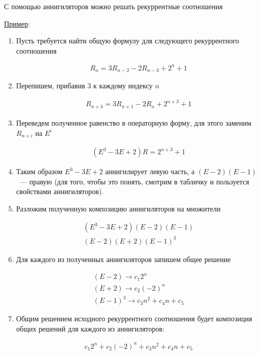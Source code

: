 С помощью аннигиляторов можно решать рекуррентные соотношения

\underline{Пример}:
\begin{enumerate}
  \item Пусть требуется найти общую формулу для следующего рекуррентного
  соотношения
  
  \begin{align*}
    R_{n} = 3 R_{n - 2} - 2R_{n - 3} + 2^{n} + 1
  \end{align*}

  \item Перепишем, прибавив \(3\) к каждому индексу \(n\)
  
  \begin{align*}
    R_{n + 3} = 3 R_{n + 1} - 2R_{n} + 2^{n + 3} + 1
  \end{align*}

  \item Переведем полученное равенство в операторную форму, для этого заменим
  \(R_{n + i}\) на \(E^{i}\)

  \begin{align*}
    (E^3 - 3E + 2) R = 2^{n + 3} + 1
  \end{align*}

  \item Таким образом \(E^3 - 3E + 2\) аннигилирует левую часть, а
  \((E - 2)(E - 1)\)~--- правую (для того, чтобы это понять, смотрим в табличку
  и пользуется свойствами аннигиляторов).

  \item Разложим полученную композицию аннигиляторов на множители
  
  \begin{align*}
    (E^3 - 3E + 2)(E - 2)(E - 1) \\
    (E - 2)(E + 2)(E - 1)^{3}
  \end{align*}

  \item Для каждого из полученных аннигиляторов запишем общее решение
  
  \begin{align*}
    (E - 2) \longrightarrow c_{1} 2^{n} \\
    (E + 2) \longrightarrow c_{2} (-2)^{n} \\
    (E - 1)^3 \longrightarrow c_{3} n^{2} + c_{4} n + c_{5}
  \end{align*}

  \item Общим решением исходного рекуррентного соотношения будет композиция
  общих решений для каждого из аннигиляторов:

  \begin{align*}
    c_{1} 2^{n} + c_{2} (-2)^{n} + c_{3} n^{2} + c_{4} n + c_{5}
  \end{align*}
\end{enumerate}
